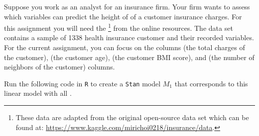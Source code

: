 \setcounter{chapter}{8}
\setcounter{section}{6}
\setcounter{question}{0}



Suppose you work as an analyst for an insurance firm. Your firm wants to assess which variables can predict the height of of a customer insurance charges. For this assignment you will need the \footnote{These data are adapted from the original open-source data set which can be found at: \url{https://www.kaggle.com/mirichoi0218/insurance/data}.} from the online resources. The data set contains a sample of 1338 health insurance customer and their recorded variables. For the current assignment, you can focus on the columns  (the total charges of the customer),  (the customer age),  (the customer BMI score), and  (the number of neighbors of the customer) columns. \\




Run the following code in \texttt{R} to create a \texttt{Stan} model $M_1$ that corresponds to this linear model with all . \\

